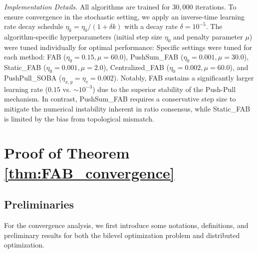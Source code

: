 \documentclass{article}
\theoremstyle{plain}
\theoremstyle{definition}
\theoremstyle{remark}
\begin{document}
\textit{Implementation Details.} 
All algorithms are trained for $30,000$ iterations. To ensure convergence in the stochastic setting, we apply an inverse-time learning rate decay schedule $\eta_k = \eta_0 / (1 + \delta k)$ with a decay rate $\delta=10^{-5}$. The algorithm-specific hyperparameters (initial step size $\eta_0$ and penalty parameter $\mu$) were tuned individually for optimal performance:
Specific settings were tuned for each method: FAB ($\eta_0{=}0.15, \mu{=}60.0$), PushSum\_FAB ($\eta_0{=}0.001, \mu{=}30.0$), Static\_FAB ($\eta_0{=}0.001, \mu{=}2.0$), Centralized\_FAB ($\eta_0{=}0.002, \mu{=}60.0$), and PushPull\_SOBA ($\eta_{x,y}{=}\eta_v{=}0.002$). 
Notably, FAB sustains a significantly larger learning rate ($0.15$ vs. $\sim 10^{-3}$) due to the superior stability of the Push-Pull mechanism. In contrast, PushSum\_FAB requires a conservative step size to mitigate the numerical instability inherent in ratio consensus, while Static\_FAB is limited by the bias from topological mismatch.

\newpage 






\section{Proof of Theorem \ref{thm:FAB_convergence}} 
\label{app:proof_fab}

\subsection{Preliminaries} 
\label{app:fab_prelim}

For the convergence analysis, we first introduce some notations, definitions, and preliminary results for both the bilevel optimization problem and distributed optimization.
\end{document}
